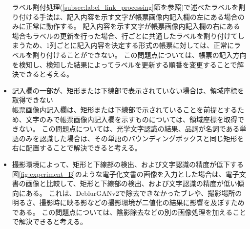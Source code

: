 \begin{itemize}
        ラベル割付処理(\ref{subsec:label_link_processing}節を参照)で述べたラベルを割り付ける手法は、記入内容を示す文字が帳票画像内記入欄の左にある場合のみに正常に動作する。
        記入内容を示す文字が帳票画像内記入欄の右にある場合もラベルの更新を行った場合、行ごとに共通したラベルを割り付けてしまうため、1列ごとに記入内容を決定する形式の帳票に対しては、正常にラベルを割り付けることができない。
        この問題点については、帳票の記入方向を検知し、検知した結果によってラベルを更新する順番を変更することで解決できると考える。
    \item 記入欄の一部が、矩形または下線部で表示されていない場合は、領域座標を取得できない\\
        帳票画像内記入欄は、矩形または下線部で示されていることを前提とするため、文字のみで帳票画像内記入欄を示すものについては、領域座標を取得できない。
        この問題点については、光学文字認識の結果、品詞が名詞である単語のみを認識した場合は、その単語のバウンディングボックスと同じ矩形を右に配置することで解決できると考える。
    \item 撮影環境によって、矩形と下線部の検出、および文字認識の精度が低下する\\
        図\ref{fig:experiment_B}のような電子化文書の画像を入力とした場合は、電子文書の画像と比較して、矩形と下線部の検出、および文字認識の精度が低い傾向にある。
        これは、DeblurGANv2で除去できなかったブレや、撮影場所の明るさ、撮影時に映る影などの撮影環境が二値化の結果に影響を及ぼすためである。
        この問題点については、陰影除去などの別の画像処理を加えることで解決できると考える。
\end{itemize}